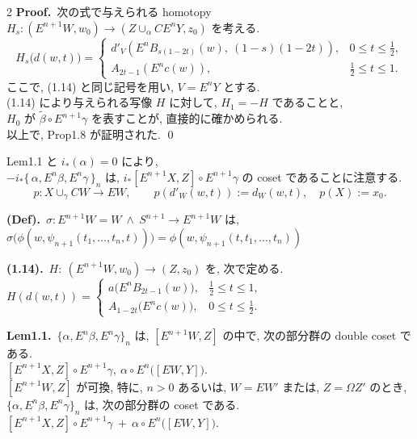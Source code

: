 \documentclass[10pt, leqno]{ltjsarticle}
\newcommand{\Ex}{E}        %
\newcommand{\todai}[2][]{\{\,#2\,\}_{#1}}      %
\numberwithin{equation}{section}
\theoremstyle{plain}
\theoremstyle{definition}
\theoremstyle{remark}
\begin{document}
\begin{paracol}{2}
\noindent
\textbf{Proof.}\
次の式で与えられる homotopy  
\(H_s:(E^{n+1}W,w_0)\to (Z\cup_\alpha CE^n Y, z_0)\)
を考える.
\[
H_s\bigl(d(w,t)\bigr)=
\begin{cases}
d'_V\!\left(E^nB_{s(1-2t)}(w),\ (1-s)(1-2t)\right), & 0\le t\le \tfrac12,\\
A_{2t-1}\!\left(E^n c(w)\right), & \tfrac12\le t\le 1.
\end{cases}
\]
ここで, (1.14) と同じ記号を用い, \(V= E^n Y\) とする.\\
(1.14) により与えられる写像 \(H\) に対して, 
\(H_1 = -H\) であることと,\\
\(H_0\) が 
\(\widetilde{\beta}\circ E^{n+1}\gamma\)
を表すことが, 
直接的に確かめられる.\\
以上で, Prop1.8 が証明された.
\qed

Lem1.1 と \(i_*(\alpha) = 0\) により,\\
\(-i_*\todai[n]{\alpha, E^n\beta, E^n\gamma}\) は, 
\(i_*[E^{n+1}X, Z]\circ E^{n+1}\gamma\)
の coset であることに注意する.
\begin{equation}\label{eq:p-def}
p:X\cup_\gamma CW\to EW,\qquad
p(d'_W(w, t)) := d_W(w, t),\quad
p(X) := x_0.
\end{equation}

\switchcolumn

\noindent
\textbf{(Def).}\
$\sigma:\Ex^{n+1}W=W\ \wedge\ S^{n+1}\to \Ex^{n+1}W$ は,\\
\(
\sigma\bigl(\phi(w,\psi_{n+1}(t_1,\ldots,t_n,t))\bigr)=\phi(w, \psi_{n+1}(t, t_1,\ldots,t_n))
\)

\noindent
\textbf{(1.14).}\ $H:\ (\Ex^{n+1}W,w_0)\to (Z,z_0)$ を, 次で定める. \\
\(
H(d(w,t))=
\begin{cases}
a\bigl(\Ex^n B_{2t-1}(w)\bigr), & \tfrac12\le t\le 1,\\[2mm]
A_{1-2t}\bigl(\Ex^n c(w)\bigr), & 0\le t\le \tfrac12.
\end{cases}
\)

\noindent
\textbf{Lem1.1.}\ 
$\{\alpha,\Ex^n\beta,\Ex^n\gamma\}_n$ は,
$[\Ex^{n+1}W, Z]$ の中で,
次の部分群の double coset である.\\
\([\Ex^{n+1}X, Z]\circ \Ex^{n+1}\gamma, \
\alpha\circ \Ex^n\!\bigl([\Ex W, Y]\bigr).\)\\
$[\Ex^{n+1}W, Z]$ が可換,
特に, $n>0$ あるいは, $W=\Ex W'$ または, $Z=\Omega Z'$ のとき, \\
\(\{\alpha,\Ex^n\beta,\Ex^n\gamma\}_n\)
は, 次の部分群の coset である.\\
\([\Ex^{n+1}X, Z]\circ \Ex^{n+1}\gamma \ +\ 
\alpha\circ \Ex^n\!\bigl([\Ex W, Y]\bigr).\)


\end{paracol}
\end{document}
